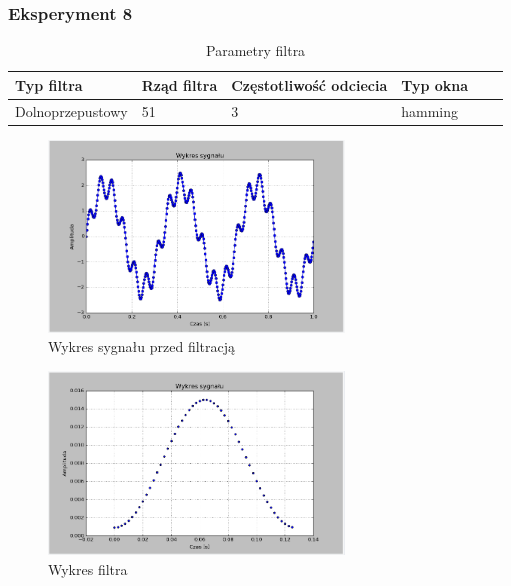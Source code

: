 \documentclass{article}
\begin{document}
{        \subsubsection{Eksperyment 8} {
            \begin{table}[h!]
            \centering
            \begin{tabular}{|l|l|l|l|l|l|}
            \hline
            Typ filtra & Rząd filtra & Częstotliwość odciecia & Typ okna  \\\hline
            Dolnoprzepustowy & 51 & 3 & hamming     \\\hline
            \end{tabular}
            \caption{Parametry filtra}
            \end{table}
            \begin{figure}[h!]
                \centering
                \includegraphics[width=0.7\textwidth]{img/sig.png}
                \caption{Wykres sygnału przed filtracją}
            \end{figure}
            \begin{figure}[h!]
                \centering
                \includegraphics[width=0.7\textwidth]{img/fil15.png}
                \caption{Wykres filtra}
            \end{figure}

}}
\end{document}

